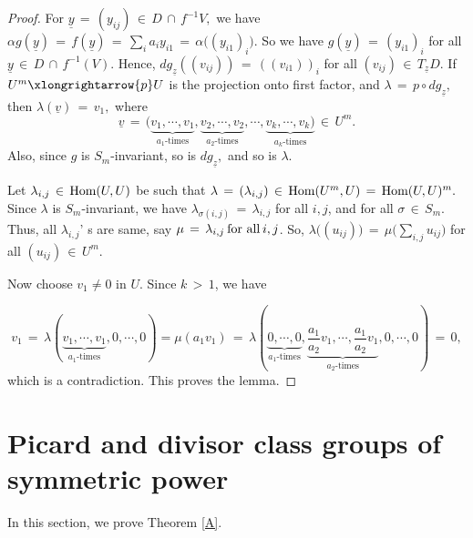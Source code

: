 \documentclass[12pt,reqno]{amsart}
\theoremstyle{definition}
\numberwithin{equation}{section}
\begin{document}
\begin{proof}
For $ \underline{y}\,=\, (y_{ij})\, \in\, D\, \cap\, f^{-1}V,$ we have $ \alpha g (\underline{y})\,=\, f(\underline{y})\,=\, \sum_{i}a_{i}y_{i1}\,=\, \alpha\big( (y_{i1})_{i}\big).$ So we have  $g(\underline{y})\,=\, (y_{i1})_{i}$ for all $\underline{y}\,\in\, D\, \cap\, f^{-1}(V).$ Hence, $ dg_{\underline{z}}((v_{ij}))\,=\, ((v_{i1}))_{i}$ for all $(v_{ij})\, \in\, T_{\underline{z}}D.$  If $ U^{m} \xlongrightarrow{p} U$ is the projection onto first factor, and  $ \lambda\, =\, p\circ dg_{\underline{z}},$ then $ \lambda({\underline{v}})\,=\, v_{1},$ where $$ \underline{v}\,=\,(\underbrace{v_{1},\cdots,v_{1}}_{a_{1}\text{-times}}, \underbrace{v_{2},\cdots,v_{2}}_{a_{2}\text{-times}},\cdots, \underbrace{v_{k},\cdots,v_{k})}_{a_{k}\text{-times}}\, \in\, U^{m}. $$ Also, since $g$ is $S_{m}$-invariant, so is $ dg_{\underline{z}},$ and so is $\lambda.$  

Let $ \lambda_{i,j} \,\in\, \textnormal{Hom}(U,U)$ be such that $ \lambda\, =\,( \lambda_{i,j})\,\in\, \textnormal{Hom}(U^{m},U) \,=\, \textnormal{Hom}(U,U)^m.$ Since $ \lambda$ is $S_{m}$-invariant, we have $ \lambda_{\sigma(i,j)}\,=\, \lambda_{i,j}$ for all $i,j$, and for all $ \sigma\, \in\, S_{m}.$ Thus, all $ \lambda_{i,j}$' s are same, say $ \mu\,=\, \lambda_{i,j}\hspace{2pt}\textnormal{for all} \hspace{2pt} i,j$.  So, $ \lambda\big( ( u_{ij}) \big)\,=\, \mu \big( \sum_{i,j}u_{ij} \big)$ for all $ (u_{ij})\, \in\, U^{m}.$ 

Now choose $v_{1} \neq 0$ in $U$. Since $ k\,>\,1$, we have 

$$ v_{1}\,=\, \lambda (\underbrace{v_{1},\cdots, v_{1}}_{a_{1} \text{-times}},0,\cdots,0)=\mu(a_{1}v_{1})\,= \,\lambda(\underbrace{0,\cdots, 0}_{a_{1} \text{-times}} ,\underbrace{\frac{a_{1}}{a_{2}}v_{1},\cdots, \frac{a_{1}}{a_{2}}v_{1}}_{a_{2} \text{-times}},0,\cdots,0)\,=\,0,$$ which is a contradiction. This proves the lemma.  
\end{proof}
\section{Picard and divisor class groups of symmetric power}

In this section, we prove Theorem \ref{A}.
\end{document}

